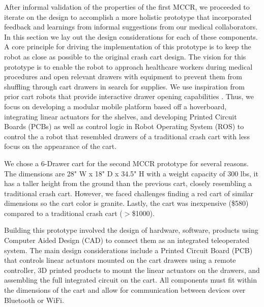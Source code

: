After informal validation of the properties of the first MCCR, we proceeded to iterate on the design to accomplish a more holistic prototype that incorporated feedback and learnings from informal suggestions from our medical collaborators. 
In this section we lay out the design considerations for each of these components. 
A core principle for driving the implementation of this prototype is to keep the robot as close as possible to the original crash cart design. 
The vision for this prototype is to enable the robot to approach healthcare workers during medical procedures and open relevant drawers with equipment to prevent them from shuffling through cart drawers in search for supplies.
We use inspiration from prior cart robots that provide interactive drawer opening capabilities \cite{mok2015place}.
Thus, we focus on developing a modular mobile platform based off a hoverboard, integrating linear actuators for the shelves, and developing Printed Circuit Boards (PCBs) as well as control logic in Robot Operating System (ROS) to control the a robot that resembled drawers of a traditional crash cart with less focus on the appearance of the cart.

We chose a 6-Drawer cart for the second MCCR prototype for several reasons. 
The dimensions are 28" W x 18" D x 34.5" H with a weight capacity of 300 lbs, it has a taller height from the ground than the previous cart, closely resembling a traditional crash cart.
However, we faced challenges finding a red cart of similar dimensions so the cart color is granite.
Lastly, the cart was inexpensive (\$580) compared to a traditional crash cart ($>$\$1000).


Building this prototype involved the design of hardware, software, products using Computer Aided Design (CAD) to connect them as an integrated teleoperated system.
The main design considerations include a Printed Circuit Board (PCB) that controls linear actuators mounted on the cart drawers using a remote controller, 3D printed products to mount the linear actuators on the drawers, and assembling the full integrated circuit on the cart.
All components must fit within the dimensions of the cart and allow for communication between devices over Bluetooth or WiFi.

